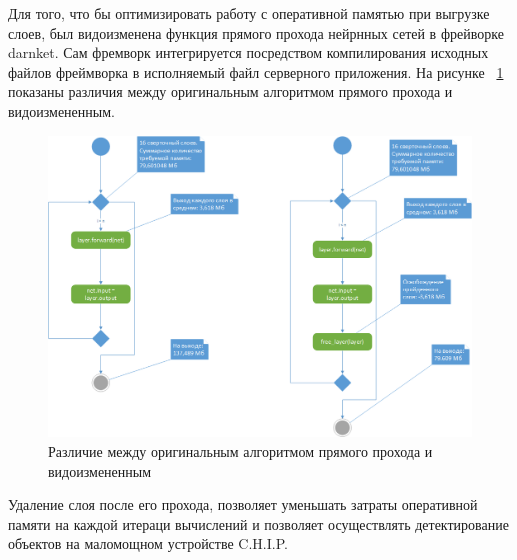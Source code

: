 \documentclass[a4paper,english,russian]{G2-105}
\begin{document}
\par Для того, что бы оптимизировать работу с оперативной памятью при выгрузке слоев, был видоизменена функция прямого прохода нейрнных сетей в фрейворке darnket. Сам фремворк интегрируется посредством компилирования исходных файлов фреймворка в исполняемый файл серверного приложения. На рисунке ~\ref{alg} показаны различия между оригинальным алгоритмом прямого прохода и видоизмененным.
\begin{figure}
    \includegraphics[width=\linewidth]{alg.png}
    \caption{Различие между оригинальным алгоритмом прямого прохода и видоизмененным}
	\label{alg}
\end{figure}
\par Удаление слоя после его прохода, позволяет уменьшать затраты оперативной памяти на каждой итераци вычислений и позволяет осуществлять детектирование объектов на маломощном устройстве C.H.I.P.
\ttl
\end{document}
